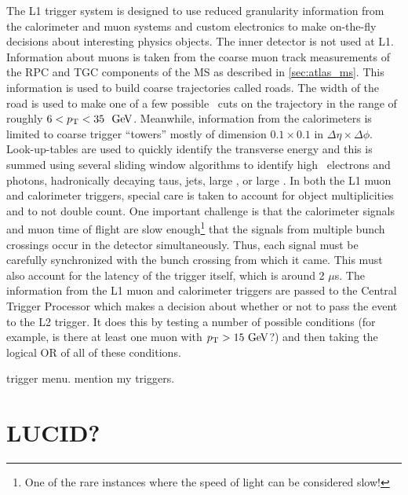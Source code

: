 The L1 trigger system is designed to use reduced granularity information
from the calorimeter and muon systems and custom electronics
to make on-the-fly decisions about interesting physics objects.
The inner detector is not used at L1.
Information about muons is taken from the coarse muon track measurements of 
the RPC and TGC components of the MS
as described in \sec\ref{sec:atlas_ms}. This information is 
used to build coarse trajectories called roads. The width of the road
is used to make one of a few possible \pt~cuts on the 
trajectory in the range of roughly $6<\pt<35~\GeV$. 
Meanwhile, information from the 
calorimeters is limited to coarse trigger ``towers'' mostly of dimension
$0.1 \times 0.1$ in $\Delta\eta \times \Delta\phi$.
Look-up-tables are used to quickly identify the transverse energy 
and this is summed using several sliding window algorithms to identify 
high \pt~electrons and photons, hadronically decaying taus, jets, large \met,
or large \et. 
In both the L1 muon and calorimeter triggers, special care is taken
to account for object multiplicities and to not double count. 
One important challenge is that the 
calorimeter signals and muon time of flight are slow enough\footnote{One
of the rare instances where the speed of light can be considered slow!}
that the signals from multiple bunch crossings occur in the detector
simultaneously.  Thus, each signal must be carefully synchronized with 
the bunch crossing from which it came.  
This must also account for the latency of the trigger itself, which
is around 2 $\mu$s.  The information
from the L1 muon and calorimeter triggers are passed to the Central
Trigger Processor which makes a decision about whether or not to pass
the event to the L2 trigger.  It does this by testing 
a number of possible conditions (for example, is there at least one
muon with $\pt > 15 \GeV$?) and then taking the logical OR of all of
these conditions.






trigger menu.
mention my triggers.






\section{LUCID?}
